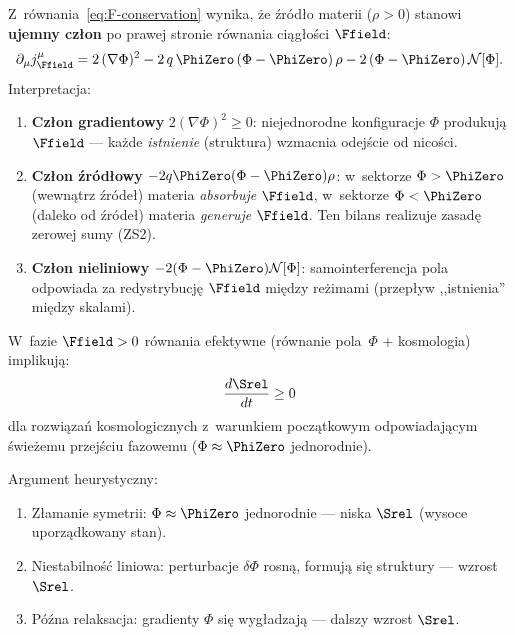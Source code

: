 \begin{corollary}%
\label{cor:F-source-balance}
Z~r\'ownania~\eqref{eq:F-conservation} wynika, \.ze \'zr\'od\l{}o
materii ($\rho > 0$) stanowi \textbf{ujemny cz\l{}on} po prawej
stronie r\'ownania ci\k{a}g\l{}o\'sci $\Ffield$:
\begin{equation}\label{eq:F-source}
  \partial_\mu j_{\Ffield}^\mu
  = 2\,(\nabla\Phi)^2
  - 2\,q\,\PhiZero\,(\Phi - \PhiZero)\,\rho
  - 2\,(\Phi - \PhiZero)\,\mathcal{N}[\Phi].
\end{equation}
Interpretacja:
\begin{enumerate}[nosep]
  \item \textbf{Cz\l{}on gradientowy} $2(\nabla\Phi)^2 \geq 0$:
    niejednorodne konfiguracje $\Phi$ produkuj\k{a} $\Ffield$ ---
    ka\.zde \emph{istnienie} (struktura) wzmacnia odej\'scie
    od nico\'sci.
  \item \textbf{Cz\l{}on \'zr\'od\l{}owy} $-2q\PhiZero(\Phi-\PhiZero)\rho$:
    w~sektorze $\Phi > \PhiZero$ (wewn\k{a}trz \'zr\'ode\l{})
    materia \emph{absorbuje} $\Ffield$, w~sektorze
    $\Phi < \PhiZero$ (daleko od \'zr\'ode\l{}) materia
    \emph{generuje} $\Ffield$. Ten bilans realizuje
    zasad\k{e} zerowej sumy (ZS2).
  \item \textbf{Cz\l{}on nieliniowy} $-2(\Phi-\PhiZero)\mathcal{N}[\Phi]$:
    samointerferencja pola odpowiada za redystrybucj\k{e} $\Ffield$
    mi\k{e}dzy re\.zimami (przep\l{}yw ,,istnienia'' mi\k{e}dzy skalami).
\end{enumerate}
\end{corollary}

\begin{hypothesis}\label{hyp:second-law}
W~fazie $\Ffield > 0$ r\'ownania efektywne
(r\'ownanie pola~$\Phi$ + kosmologia) implikuj\k{a}:
\begin{equation}\label{eq:second-law}
    \frac{d\Srel}{dt} \geq 0
\end{equation}
dla rozwi\k{a}za\'n kosmologicznych z~warunkiem
pocz\k{a}tkowym odpowiadaj\k{a}cym \'swie\.zemu
przej\'sciu fazowemu ($\Phi \approx \PhiZero$ jednorodnie).

Argument heurystyczny:
\begin{enumerate}[nosep]
  \item Z\l{}amanie symetrii: $\Phi \approx \PhiZero$ jednorodnie
    --- niska $\Srel$ (wysoce uporz\k{a}dkowany stan).
  \item Niestabilno\'s\'c liniowa: perturbacje $\delta\Phi$
    rosn\k{a}, formuj\k{a} si\k{e} struktury --- wzrost $\Srel$.
  \item P\'o\'zna relaksacja: gradienty $\Phi$ si\k{e}
    wyg\l{}adzaj\k{a} --- dalszy wzrost $\Srel$.
\end{enumerate}
\end{hypothesis}

